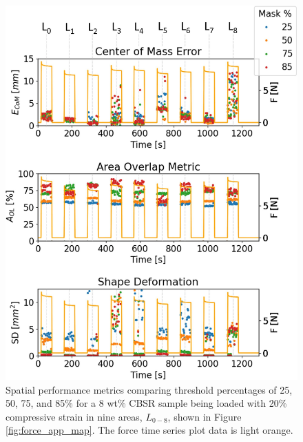 \begin{figure}[H]
    \centering
    \includegraphics[width=0.8\linewidth]{Figures/CBSR_8p_9push_20strain_60s_4_metrics_thresh_masks_v2_numbd.jpg}
    \caption{Spatial performance metrics comparing threshold percentages of 25, 50, 75, and 85\% for a 8 wt\% CBSR sample being loaded with 20\% compressive strain in nine areas, $L_{0-8}$, shown in Figure \ref{fig:force_app_map}. The force time series plot data is light orange.} %
    \label{fig:recon_perform_8p}
\end{figure}


